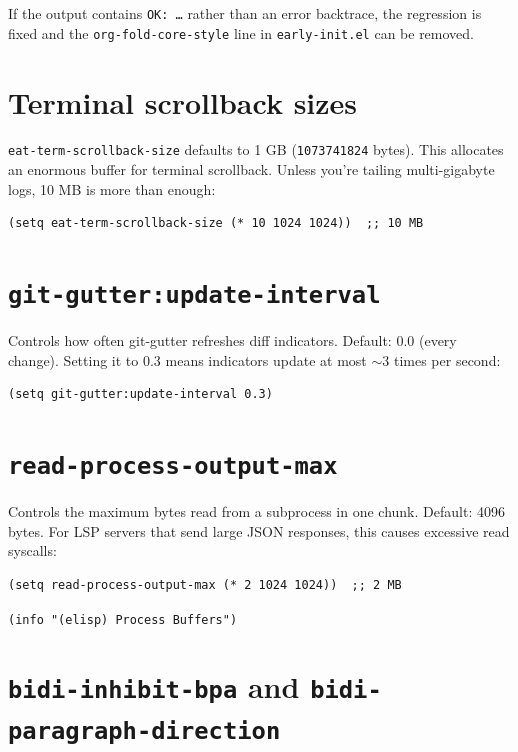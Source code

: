 If the output contains \texttt{OK: …} rather than an error backtrace, the regression is fixed and the \texttt{org-fold-core-style} line in \texttt{early-init.el} can be removed.

\section{Terminal scrollback sizes}\label{terminal-scrollback-sizes}

\texttt{eat-term-scrollback-size} defaults to 1 GB (\texttt{1073741824} bytes). This allocates an enormous buffer for terminal scrollback. Unless you're tailing multi-gigabyte logs, 10 MB is more than enough:

\begin{verbatim}
(setq eat-term-scrollback-size (* 10 1024 1024))  ;; 10 MB
\end{verbatim}

\section{\texttt{git-gutter:update-interval}}\label{git-gutterupdate-interval}

Controls how often git-gutter refreshes diff indicators. Default: 0.0 (every change). Setting it to 0.3 means indicators update at most \(\sim\)3 times per second:

\begin{verbatim}
(setq git-gutter:update-interval 0.3)
\end{verbatim}

\section{\texttt{read-process-output-max}}\label{read-process-output-max}

Controls the maximum bytes read from a subprocess in one chunk. Default: 4096 bytes. For LSP servers that send large JSON responses, this causes excessive read syscalls:

\begin{verbatim}
(setq read-process-output-max (* 2 1024 1024))  ;; 2 MB
\end{verbatim}

\texttt{(info "(elisp) Process Buffers")}

\section{\texttt{bidi-inhibit-bpa} and \texttt{bidi-paragraph-direction}}\label{bidi-inhibit-bpa-and-bidi-paragraph-direction}

